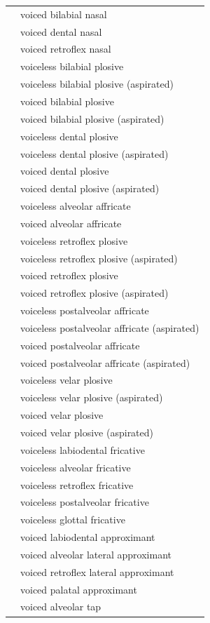 \documentclass{article}
\begin{document}
\begin{xltabular}{\textwidth}{lL}
   & voiced bilabial nasal \\
   & voiced dental nasal \\
   & voiced retroflex nasal \\
   & voiceless bilabial plosive \\
   & voiceless bilabial plosive (aspirated) \\
   & voiced bilabial plosive \\
   & voiced bilabial plosive (aspirated) \\
   & voiceless dental plosive \\
   & voiceless dental plosive (aspirated) \\
   & voiced dental plosive \\
   & voiced dental plosive (aspirated) \\
   & voiceless alveolar affricate \\
   & voiced alveolar affricate \\
   & voiceless retroflex plosive \\
   & voiceless retroflex plosive (aspirated) \\
   & voiced retroflex plosive \\
   & voiced retroflex plosive (aspirated) \\
   & voiceless postalveolar affricate \\
   & voiceless postalveolar affricate (aspirated) \\
   & voiced postalveolar affricate \\
   & voiced postalveolar affricate (aspirated) \\
   & voiceless velar plosive \\
   & voiceless velar plosive (aspirated) \\
   & voiced velar plosive \\
   & voiced velar plosive (aspirated) \\
   & voiceless labiodental fricative \\
   & voiceless alveolar fricative \\
   & voiceless retroflex fricative \\
   & voiceless postalveolar fricative \\
   & voiceless glottal fricative \\
   & voiced labiodental approximant \\
   & voiced alveolar lateral approximant \\
   & voiced retroflex lateral approximant \\
   & voiced palatal approximant \\
   & voiced alveolar tap \\
\end{xltabular}
\end{document}

